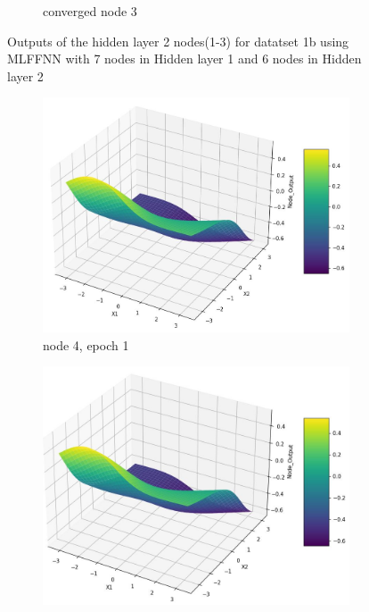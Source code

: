 \documentclass[11pt]{article}
\begin{document}
\begin{figure}[h!]
\begin{subfigure}[b]{0.45\textwidth}
	\caption{converged node 3}
	\label{fig:fig2.1.6.15}
	\end{subfigure}
\caption{Outputs of the hidden layer 2 nodes(1-3) for datatset 1b using MLFFNN with 7 nodes in Hidden layer 1 and 6 nodes in Hidden layer 2}
\label{fig:fig2.1.6}
\end{figure}
\newpage

\begin{figure}[h!]
\centering
	\begin{subfigure}[b]{0.3\textwidth}
	\centering
	\includegraphics[scale=0.14]{hidden2_n4_e1.jpg}
	\caption{node 4, epoch 1}
	\label{fig:fig2.1.7.1}
	\end{subfigure}
	\begin{subfigure}[b]{0.3\textwidth}
	\centering
	\includegraphics[scale=0.14]{hidden2_n4_e5.jpg}

\end{subfigure}
\end{figure}
\end{document}
